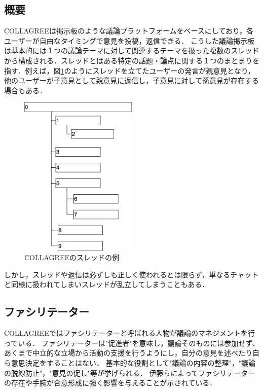\subsection{概要}
COLLAGREEは掲示板のような議論プラットフォームをベースにしており，各ユーザーが自由なタイミングで意見を投稿，返信できる．
こうした議論掲示板は基本的には１つの議論テーマに対して関連するテーマを扱った複数のスレッドから構成される．スレッドとはある特定の話題・論点に関する１つのまとまりを指す．例えば，図\ref{Fig:thread1}のようにスレッドを立てたユーザーの発言が親意見となり，他のユーザーが子意見として親意見に返信し，子意見に対して孫意見が存在する場合もある．
\begin{figure}[htbp]
 \begin{center}
  \includegraphics[width=0.5\textwidth]{../images/2.Related_Work/COLLAGREE_thread.png}
  \caption{COLLAGREEのスレッドの例}
  \label{Fig:thread1}
  \vspace{-10pt}
 \end{center}
\end{figure}

しかし，スレッドや返信は必ずしも正しく使われるとは限らず，単なるチャットと同様に扱われてしまいスレッドが乱立してしまうこともある．

\subsection{ファシリテーター}
COLLAGREEではファシリテーターと呼ばれる人物が議論のマネジメントを行っている．
ファシリテーターは"促進者"を意味し，議論そのものには参加せず、あくまで中立的な立場から活動の支援を行うようにし，自分の意見を述べたり自ら意思決定をすることはない．
基本的な役割として"議論の内容の整理"，"議論の脱線防止"，"意見の促し"等が挙げられる．
伊藤ら\cite{facilitation}によってファシリテーターの存在や手腕が合意形成に強く影響を与えることが示されている．

